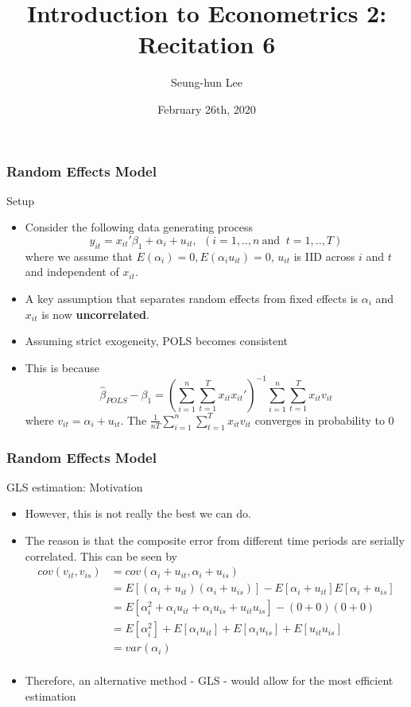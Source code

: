 \documentclass{beamer}
\title[Econometrics 2]{Introduction to Econometrics 2: Recitation 6} %
\author{Seung-hun Lee}
\institute{Columbia University}
\date{February 26th, 2020}
\begin{document}
\begin{frame}
\titlepage
\end{frame}


\begin{frame}
\frametitle{Random Effects Model}
Setup
\begin{itemize}
\item Consider the following data generating process
\[
y_{it}=x_{it}'\beta_1 + \alpha_i +u_{it}, \ \ (i=1,..,n \ \text{and } \ t=1,..,T)
\]
where we assume that $E(\alpha_i)=0, E(\alpha_i u_{it})=0$, $u_{it}$ is IID across $i$ and $t$ and independent of $x_{it}$.
\item A key assumption that separates random effects from fixed effects is $\alpha_i$ and $x_{it}$ is now \textbf{uncorrelated}.
\item Assuming strict exogeneity, POLS becomes consistent
\item This is because
\[
\hat{\beta}_{POLS}-\beta_1 =\left( \sum_{i=1}^n\sum_{t=1}^T x_{it} x_{it}'\right)^{-1}\sum_{i=1}^n\sum_{t=1}^T x_{it} v_{it}
\]
where $v_{it}=\alpha_i + u_{it}$. The $\frac{1}{nT}\sum_{i=1}^n\sum_{t=1}^T x_{it} v_{it}$ converges in probability to 0
\end{itemize}
\end{frame}

\begin{frame}
\frametitle{Random Effects Model}
GLS estimation: Motivation
\begin{itemize}
\item However, this is not really the best we can do.
\item  The reason is that the composite error from different time periods are serially correlated. This can be seen by
\[
\begin{aligned}
cov(v_{it},v_{is})&=cov(\alpha_i + u_{it},\alpha_i + u_{is})\\
&=E[(\alpha_i + u_{it})(\alpha_i + u_{is})]-E[\alpha_i + u_{it}]E[\alpha_i + u_{is}]\\
&=E[\alpha_i^2 + \alpha_iu_{it}+\alpha_iu_{is}+u_{it}u_{is}]-(0+0)(0+0)\\
&=E[\alpha_i^2] + E[\alpha_iu_{it}]+E[\alpha_iu_{is}]+E[u_{it}u_{is}]\\
&=var(\alpha_i)\\
\end{aligned}
\]
\item Therefore, an alternative method - GLS - would allow for the most efficient estimation
\end{itemize}
\end{frame}
\end{document}
